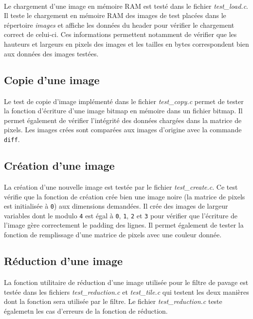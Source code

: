 \documentclass{article}
\begin{document}
    \paragraph{}
    Le chargement d'une image en mémoire RAM est testé dans le fichier \emph{test\_load.c}. Il teste le chargement en mémoire RAM des images de test placées dans le répertoire \emph{images} et affiche les données du header pour vérifier le chargement correct de celui-ci. Ces informations permettent notamment de vérifier que les hauteurs et largeurs en pixels des images et les tailles en bytes correspondent bien aux données des images testées.

    \subsection{Copie d'une image}
    \paragraph{}
    Le test de copie d'image implémenté dans le fichier \emph{test\_copy.c} permet de tester la fonction d'écriture d'une image bitmap en mémoire dans un fichier bitmap. Il permet également de vérifier l'intégrité des données chargées dans la matrice de pixels. Les images crées sont comparées aux images d'origine avec la commande \texttt{diff}.


    \subsection{Création d'une image}
    \paragraph{}
    La création d'une nouvelle image est testée par le fichier \emph{test\_create.c}. Ce test vérifie que la fonction de création crée bien une image noire (la matrice de pixels est initialisée à \texttt{0}) aux dimensions demandées. Il crée des images de largeur variables dont le modulo \texttt{4} est égal à \texttt{0}, \texttt{1}, \texttt{2} et \texttt{3} pour vérifier que l'écriture de l'image gère correctement le padding des lignes. Il permet également de tester la fonction de remplissage d'une matrice de pixels avec une couleur donnée.

    \subsection{Réduction d'une image}
    \paragraph{}
    La fonction utilitaire de réduction d'une image utilisée pour le filtre de pavage est testée dans les fichiers \emph{test\_reduction.c} et \emph{test\_tile.c} qui testent les deux manières dont la fonction sera utilisée par le filtre. Le fichier \emph{test\_reduction.c} teste égalemetn les cas d'erreurs de la fonction de réduction.
\end{document}
